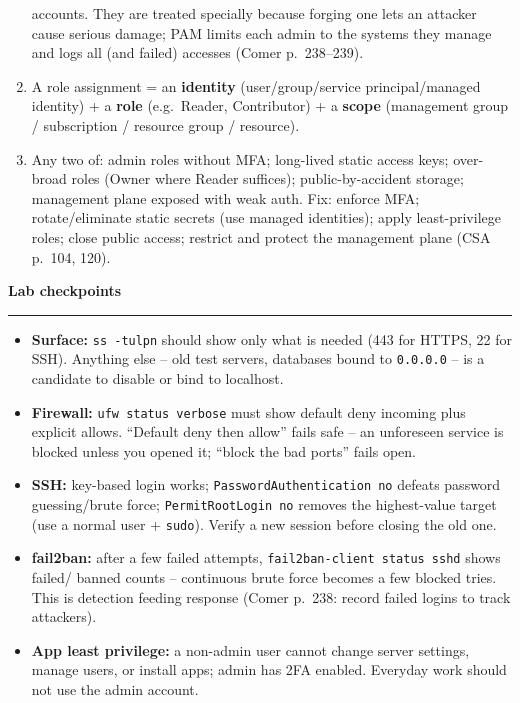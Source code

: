 \documentclass[11pt]{article}
\newcommand{\wbsection}[1]{\par\vspace{11pt}\noindent
  {\large\bfseries\color{kred}#1}\par\vspace{2pt}
  {\color{kred!35}\hrule height 1pt}\par\vspace{6pt}}
\renewcommand{\emph}[1]{\textup{#1}}
\newcommand{\cmd}[1]{\texttt{#1}}
\begin{document}
\begin{enumerate}
      accounts. They are treated specially because forging one lets an attacker cause serious damage;
      PAM limits each admin to the systems they manage and logs all (and failed) accesses (Comer
      p.~238--239).
\item A role assignment = an \textbf{identity} (user/group/service principal/managed identity) +
      a \textbf{role} (e.g.\ Reader, Contributor) + a \textbf{scope} (management group / subscription /
      resource group / resource).
\item Any two of: admin roles without MFA; long-lived static access keys; over-broad roles (Owner where
      Reader suffices); public-by-accident storage; management plane exposed with weak auth. Fix:
      enforce MFA; rotate/eliminate static secrets (use managed identities); apply least-privilege
      roles; close public access; restrict and protect the management plane (CSA p.~104, 120).
\end{enumerate}

\wbsection{Lab checkpoints}
\begin{itemize}
\item \textbf{Surface:} \cmd{ss -tulpn} should show only what is needed (443 for HTTPS, 22 for SSH).
      Anything else -- old test servers, databases bound to \cmd{0.0.0.0} -- is a candidate to disable
      or bind to localhost.
\item \textbf{Firewall:} \cmd{ufw status verbose} must show \emph{default deny incoming} plus explicit
      allows. ``Default deny then allow'' fails safe -- an unforeseen service is blocked unless you
      opened it; ``block the bad ports'' fails open.
\item \textbf{SSH:} key-based login works; \cmd{PasswordAuthentication no} defeats password
      guessing/brute force; \cmd{PermitRootLogin no} removes the highest-value target (use a normal
      user + \cmd{sudo}). Verify a new session \emph{before} closing the old one.
\item \textbf{fail2ban:} after a few failed attempts, \cmd{fail2ban-client status sshd} shows failed/
      banned counts -- continuous brute force becomes a few blocked tries. This is detection feeding
      response (Comer p.~238: record failed logins to track attackers).
\item \textbf{App least privilege:} a non-admin user cannot change server settings, manage users, or
      install apps; admin has 2FA enabled. Everyday work should not use the admin account.
\end{itemize}
\end{document}
